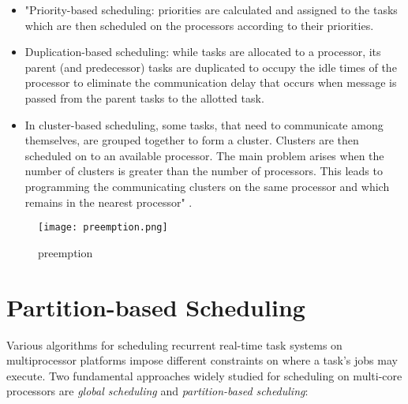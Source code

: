 \documentclass[conference]{IEEEtran}
\begin{document}
\begin{itemize}
    \item "Priority-based scheduling: priorities are calculated and assigned to the tasks which are then scheduled on the processors according to their priorities.
    \item Duplication-based scheduling: while tasks are allocated to a processor, its parent (and predecessor) tasks are duplicated to occupy the idle times of the processor to eliminate the communication delay that occurs when message is passed from the parent tasks to the allotted task.
    \item In cluster-based scheduling, some tasks, that need to communicate among themselves, are grouped together to form a cluster. Clusters are then scheduled on to an available processor. The main problem arises when the number of clusters is greater than the number of processors. This leads to programming the communicating clusters on the same processor and which remains in the nearest processor" \cite{AbdallahGB24}.
\end{itemize}

\begin{figure}[h!]
    \centering
    \texttt{[image: preemption.png]}
    \caption{preemption}
    \label{fig:preemption}
\end{figure}


\section{Partition-based Scheduling}
\label{sec: partition-based scheduling}

Various algorithms for scheduling recurrent real-time task systems on multiprocessor platforms impose different constraints on where a task's jobs may execute. Two fundamental approaches widely studied for scheduling on multi-core processors are \textit{global scheduling} and \textit{partition-based scheduling}:
\end{document}
